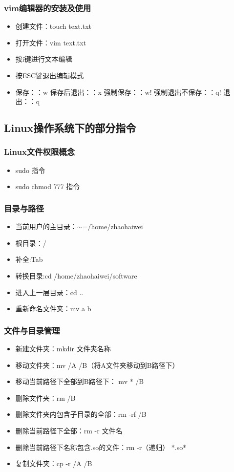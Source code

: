 \documentclass[notheorems,mathserif,table,compress]{beamer}  %
\begin{document}
\begin{frame}
  \frametitle{vim编辑器的安装及使用}
  \begin{itemize}
  \item 创建文件：touch text.txt
  \item 打开文件：vim text.txt
  \item 按i键进行文本编辑
  \item 按ESC键退出编辑模式
  \item 保存：：w 保存后退出：：x 强制保存：：w! 强制退出不保存：：q! 退出：：q
  \end{itemize}
\end{frame}

\subsection{Linux操作系统下的部分指令}

\begin{frame} 
  \frametitle{Linux文件权限概念}
  \begin{itemize}
  \item sudo 指令
  \item sudo chmod 777 指令
  \end{itemize}
\end{frame}

\begin{frame} 
  \frametitle{目录与路径}
  \begin{itemize}
  \item 当前用户的主目录：$\sim$=/home/zhaohaiwei
  \item 根目录：/
  \item 补全:Tab
  \item 转换目录:cd /home/zhaohaiwei/software
  \item 进入上一层目录：cd ..
  \item 重新命名文件夹：mv a b
  \end{itemize}
\end{frame}

\begin{frame} 
  \frametitle{文件与目录管理}
  \begin{itemize}
  \item 新建文件夹：mkdir 文件夹名称
  \item 移动文件夹：mv /A /B（将A文件夹移动到B路径下）
  \item 移动当前路径下全部到B路径下： mv * /B
  \item 删除文件夹：rm /B
  \item 删除文件夹内包含子目录的全部：rm -rf /B
  \item 删除当前路径下全部：rm -r 文件名
  \item 删除当前路径下名称包含.so的文件：rm -r（递归） *.so*
  \item 复制文件夹：cp -r /A /B
  \end{itemize}
\end{frame}
\end{document}
